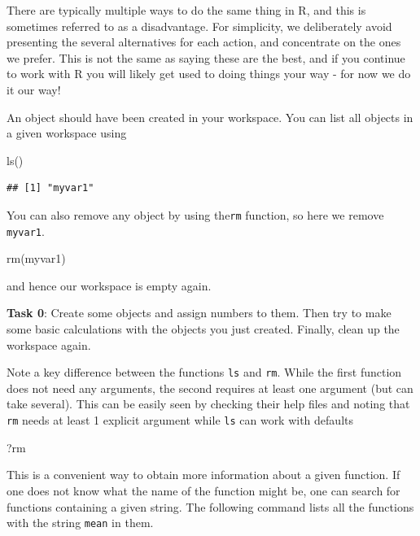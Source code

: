 \documentclass[
]{article}
\newenvironment{Shaded}{\begin{snugshade}}{\end{snugshade}}
\newcommand{\FunctionTok}[1]{\textcolor[rgb]{0.00,0.00,0.00}{#1}}
\newcommand{\NormalTok}[1]{#1}
\begin{document}
There are typically multiple ways to do the same thing in R, and this is
sometimes referred to as a disadvantage. For simplicity, we deliberately
avoid presenting the several alternatives for each action, and
concentrate on the ones we prefer. This is not the same as saying these
are the best, and if you continue to work with R you will likely get
used to doing things your way - for now we do it our way!

An object should have been created in your workspace. You can list all
objects in a given workspace using

\begin{Shaded}
\begin{Highlighting}[]
\FunctionTok{ls}\NormalTok{()}
\end{Highlighting}
\end{Shaded}

\begin{verbatim}
## [1] "myvar1"
\end{verbatim}

You can also remove any object by using the\texttt{rm} function, so here
we remove \texttt{myvar1}.

\begin{Shaded}
\begin{Highlighting}[]
\FunctionTok{rm}\NormalTok{(myvar1)}
\end{Highlighting}
\end{Shaded}

and hence our workspace is empty again.

\textbf{Task 0}: Create some objects and assign numbers to them. Then
try to make some basic calculations with the objects you just created.
Finally, clean up the workspace again.

Note a key difference between the functions \texttt{ls} and \texttt{rm}.
While the first function does not need any arguments, the second
requires at least one argument (but can take several). This can be
easily seen by checking their help files and noting that \texttt{rm}
needs at least 1 explicit argument while \texttt{ls} can work with
defaults

\begin{Shaded}
\begin{Highlighting}[]
\NormalTok{?rm}
\end{Highlighting}
\end{Shaded}

This is a convenient way to obtain more information about a given
function. If one does not know what the name of the function might be,
one can search for functions containing a given string. The following
command lists all the functions with the string \texttt{mean} in them.
\end{document}
